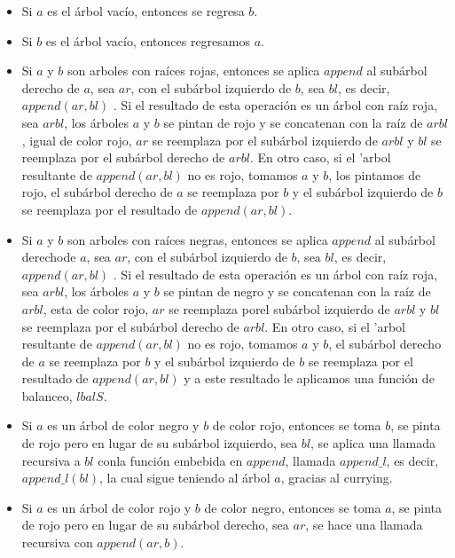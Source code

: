 \documentclass[8pt,leqno,pdflatex,spanish]{book}
\theoremstyle{plain}
\theoremstyle{definition}
\theoremstyle{remark}
\begin{document}
\begin{itemize}
    \item Si $a$ es el \'arbol vacío, entonces se regresa $b$.
    \item Si $b$ es el \'arbol vacío, entonces regresamos $a$.
    \item Si $a$ y $b$ son arboles con raíces rojas, entonces se aplica $append$ al subárbol 
    derecho de $a$, sea $ar$, con el subárbol izquierdo de $b$, sea $bl$, es decir, $append(ar,bl)$
    . Si el resultado de esta operación es un árbol con raíz roja, sea $arbl$, los \'arboles $a$ y 
    $b$ se pintan de rojo y se concatenan con la raíz de $arbl$, igual de color rojo, $ar$ se 
    reemplaza por el subárbol izquierdo de $arbl$ y $bl$ se reemplaza por el subárbol derecho de $
    arbl$.
    En otro caso, si el 'arbol resultante de $append(ar,bl)$ no es rojo, tomamos $a$ y $b$, los 
    pintamos de rojo, el subárbol derecho de $a$ se reemplaza por $b$ y el subárbol izquierdo de 
    $b$ se reemplaza por el resultado de $append(ar,bl)$.
    \item Si $a$ y $b$ son arboles con raíces negras, entonces se aplica $append$ al subárbol 
    derechode $a$, sea $ar$, con el subárbol izquierdo de $b$, sea $bl$, es decir, $append(ar,bl)$
    . Si el resultado de esta operación es un árbol con raíz roja, sea $arbl$, los \'arboles $a$ y 
    $b$ se pintan de negro y se concatenan con la raíz de $arbl$, esta de color rojo, $ar$ se 
    reemplaza porel subárbol izquierdo de $arbl$ y $bl$ se reemplaza por el subárbol derecho de $
    arbl$.
    En otro caso, si el 'arbol resultante de $append(ar,bl)$ no es rojo, tomamos $a$ y $b$, el 
    subárbol derecho de $a$ se reemplaza por $b$ y el subárbol izquierdo de $b$ se reemplaza por 
    el resultado de $append(ar,bl)$ y a este resultado le aplicamos una función de balanceo, 
    $lbalS$.
    \item Si $a$ es un \'arbol de color negro y $b$ de color rojo, entonces se toma $b$, se pinta 
    de rojo pero en lugar de su subárbol izquierdo, sea $bl$, se aplica una llamada recursiva a 
    $bl$ conla  funci\'on embebida en $append$, llamada $append\_l$, es decir, $append\_l(bl)$, la 
    cual sigue teniendo al \'arbol $a$, gracias al currying\cite{Currying}.
    \item Si $a$ es un \'arbol de color rojo y $b$ de color negro, entonces se toma $a$, se pinta 
    de rojo pero en lugar de su subárbol derecho, sea $ar$, se hace una llamada recursiva con 
    $append(ar,b)$.
\end{itemize}
\end{document}
